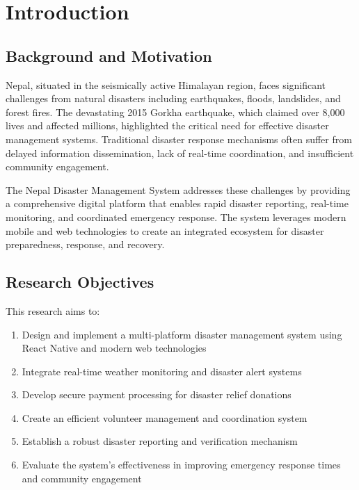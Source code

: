 \documentclass[12pt,a4paper]{article}
\begin{document}
\tableofcontents
\newpage

\section{Introduction}

\subsection{Background and Motivation}

Nepal, situated in the seismically active Himalayan region, faces significant challenges from natural disasters including earthquakes, floods, landslides, and forest fires. The devastating 2015 Gorkha earthquake, which claimed over 8,000 lives and affected millions, highlighted the critical need for effective disaster management systems. Traditional disaster response mechanisms often suffer from delayed information dissemination, lack of real-time coordination, and insufficient community engagement.

The Nepal Disaster Management System addresses these challenges by providing a comprehensive digital platform that enables rapid disaster reporting, real-time monitoring, and coordinated emergency response. The system leverages modern mobile and web technologies to create an integrated ecosystem for disaster preparedness, response, and recovery.

\subsection{Research Objectives}

This research aims to:

\begin{enumerate}
    \item Design and implement a multi-platform disaster management system using React Native and modern web technologies
    \item Integrate real-time weather monitoring and disaster alert systems
    \item Develop secure payment processing for disaster relief donations
    \item Create an efficient volunteer management and coordination system
    \item Establish a robust disaster reporting and verification mechanism
    \item Evaluate the system's effectiveness in improving emergency response times and community engagement
\end{enumerate}
\end{document}

